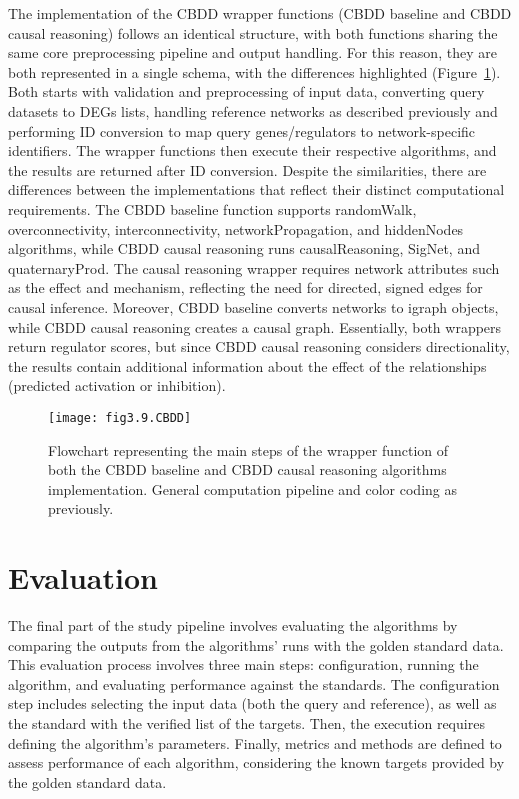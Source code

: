 The implementation of the \gls{CBDD} wrapper functions (\gls{CBDD} baseline and \gls{CBDD} causal reasoning) follows an identical structure, with both functions sharing the same core preprocessing pipeline and output handling. For this reason, they are both represented in a single schema, with the differences highlighted (Figure~\ref{fig:fig3.9.CBDD}). Both starts with validation and preprocessing of input data, converting query datasets to \gls{DEGs} lists, handling reference networks as described previously and performing ID conversion to map query genes/regulators to network-specific identifiers. The wrapper functions then execute their respective algorithms, and the results are returned after ID conversion. Despite the similarities, there are differences between the implementations that reflect their distinct computational requirements. The \gls{CBDD} baseline function supports randomWalk, overconnectivity, interconnectivity, networkPropagation, and hiddenNodes algorithms, while \gls{CBDD} causal reasoning runs causalReasoning, SigNet, and quaternaryProd. The causal reasoning wrapper requires network attributes such as the effect and mechanism, reflecting the need for directed, signed edges for causal inference. Moreover, \gls{CBDD} baseline converts networks to igraph objects, while \gls{CBDD} causal reasoning creates a causal graph. Essentially, both wrappers return regulator scores, but since \gls{CBDD} causal reasoning considers directionality, the results contain additional information about the effect of the relationships (predicted activation or inhibition).

\begin{figure}[htbp]
    \centering
    \texttt{[image: fig3.9.CBDD]}
    \caption[Flowchart representing the main steps of the wrapper function of both the CBDD baseline and CBDD causal reasoning algorithms implementation.]{Flowchart representing the main steps of the wrapper function of both the \gls{CBDD} baseline and \gls{CBDD} causal reasoning algorithms implementation. General computation pipeline and color coding as previously.}
    \label{fig:fig3.9.CBDD}
\end{figure}


\section{Evaluation} %
\label{sec:evaluation}


The final part of the study pipeline involves evaluating the algorithms by comparing the outputs from the algorithms' runs with the golden standard data. This evaluation process involves three main steps: configuration, running the algorithm, and evaluating performance against the standards. The configuration step includes selecting the input data (both the query and reference), as well as the standard with the verified list of the targets. Then, the execution requires defining the algorithm's parameters. Finally, metrics and methods are defined to assess performance of each algorithm, considering the known targets provided by the golden standard data. 

